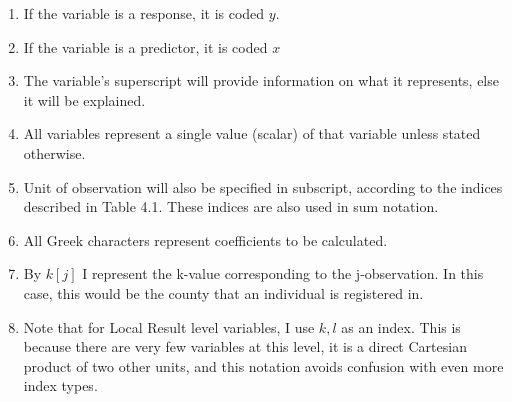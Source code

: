 \documentclass[]{article}
\providecommand{\tightlist}{%
  \setlength{\itemsep}{0pt}\setlength{\parskip}{0pt}}
\begin{document}
\begin{enumerate}
\def\labelenumi{\arabic{enumi}.}
\tightlist
\item
  If the variable is a response, it is coded \(y\).
\item
  If the variable is a predictor, it is coded \(x\)
\item
  The variable's superscript will provide information on what it
  represents, else it will be explained.
\item
  All variables represent a single value (scalar) of that variable
  unless stated otherwise.
\item
  Unit of observation will also be specified in subscript, according to
  the indices described in Table 4.1. These indices are also used in sum
  notation.
\item
  All Greek characters represent coefficients to be calculated.
\item
  By \(k[j]\) I represent the k-value corresponding to the
  j-observation. In this case, this would be the county that an
  individual is registered in.
\item
  Note that for Local Result level variables, I use \(k,l\) as an index.
  This is because there are very few variables at this level, it is a
  direct Cartesian product of two other units, and this notation avoids
  confusion with even more index types.
\end{enumerate}
\end{document}
